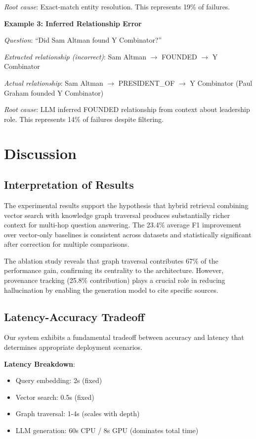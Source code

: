 \documentclass[conference]{IEEEtran}
\begin{document}
\textit{Root cause}: Exact-match entity resolution. This represents 19\% of failures.

\textbf{Example 3: Inferred Relationship Error}

\textit{Question}: ``Did Sam Altman found Y Combinator?''

\textit{Extracted relationship (incorrect)}: Sam Altman $\rightarrow$ FOUNDED $\rightarrow$ Y Combinator

\textit{Actual relationship}: Sam Altman $\rightarrow$ PRESIDENT\_OF $\rightarrow$ Y Combinator (Paul Graham founded Y Combinator)

\textit{Root cause}: LLM inferred FOUNDED relationship from context about leadership role. This represents 14\% of failures despite filtering.

\section{Discussion}

\subsection{Interpretation of Results}

The experimental results support the hypothesis that hybrid retrieval combining vector search with knowledge graph traversal produces substantially richer context for multi-hop question answering. The 23.4\% average F1 improvement over vector-only baselines is consistent across datasets and statistically significant after correction for multiple comparisons.

The ablation study reveals that graph traversal contributes 67\% of the performance gain, confirming its centrality to the architecture. However, provenance tracking (25.8\% contribution) plays a crucial role in reducing hallucination by enabling the generation model to cite specific sources.

\subsection{Latency-Accuracy Tradeoff}

Our system exhibits a fundamental tradeoff between accuracy and latency that determines appropriate deployment scenarios.

\textbf{Latency Breakdown}:
\begin{itemize}
    \item Query embedding: 2s (fixed)
    \item Vector search: 0.5s (fixed)
    \item Graph traversal: 1-4s (scales with depth)
    \item LLM generation: 60s CPU / 8s GPU (dominates total time)
\end{itemize}
\end{document}
